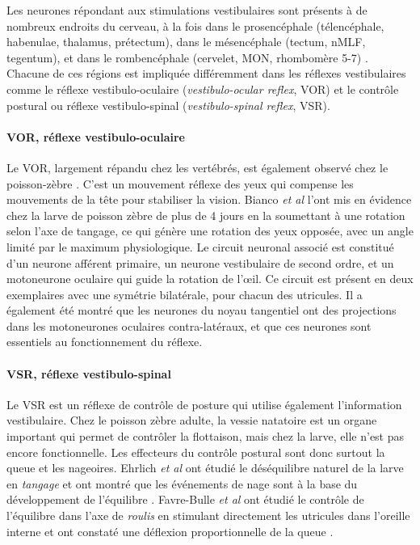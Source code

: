 Les neurones répondant aux stimulations vestibulaires sont présents à de nombreux endroits du cerveau, à la fois dans le prosencéphale (télencéphale, habenulae, thalamus, prétectum), dans le mésencéphale (tectum, nMLF, tegentum), et dans le rombencéphale (cervelet, MON, rhombomère 5-7) \cite{favre-bulle_cellular-resolution_2018}. Chacune de ces régions est impliquée différemment dans les réflexes vestibulaires comme le réflexe vestibulo-oculaire (\emph{vestibulo-ocular reflex}, VOR) et le contrôle postural ou réflexe vestibulo-spinal (\emph{vestibulo-spinal reflex}, VSR).

\paragraph{VOR, réflexe vestibulo-oculaire} \label{VOR}
Le VOR, largement répandu chez les vertébrés, est également observé chez le poisson-zèbre \cite{bianco_tangential_2012}. C'est un mouvement réflexe des yeux qui compense les mouvements de la tête pour stabiliser la vision. Bianco \emph{et al} l'ont mis en évidence chez la larve de poisson zèbre de plus de 4 jours en la soumettant à une rotation selon l'axe de tangage, ce qui génère une rotation des yeux opposée, avec un angle limité par le maximum physiologique. Le circuit neuronal associé est constitué d'un neurone afférent primaire, un neurone vestibulaire de second ordre, et un motoneurone oculaire qui guide la rotation de l’œil. Ce circuit est présent en deux exemplaires avec une symétrie bilatérale, pour chacun des utricules. Il a également été montré que les neurones du noyau tangentiel ont des projections dans les motoneurones oculaires contra-latéraux, et que ces neurones sont essentiels au fonctionnement du réflexe. 

\paragraph{VSR, réflexe vestibulo-spinal} \label{VSR}
Le VSR est un réflexe de contrôle de posture qui utilise également l'information vestibulaire. Chez le poisson zèbre adulte, la vessie natatoire est un organe important qui permet de contrôler la flottaison, mais chez la larve, elle n'est pas encore fonctionnelle. Les effecteurs du contrôle postural sont donc surtout la queue et les nageoires. Ehrlich \emph{et al} ont étudié le déséquilibre naturel de la larve en \emph{tangage} et ont montré que les événements de nage sont à la base du développement de l'équilibre \cite{ehrlich_control_2017}. Favre-Bulle \emph{et al} ont étudié le contrôle de l'équilibre dans l'axe de \emph{roulis} en stimulant directement les utricules dans l'oreille interne et ont constaté une déflexion proportionnelle de la queue \cite{favre-bulle_cellular-resolution_2018}.

